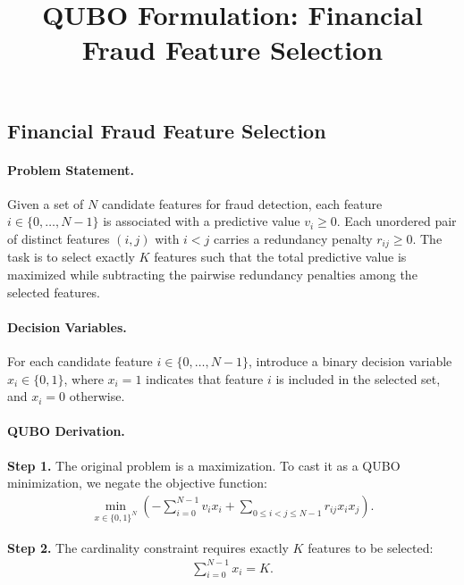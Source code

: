 \documentclass[12pt]{article}
\title{QUBO Formulation: Financial Fraud Feature Selection}
\date{}
\begin{document}
\maketitle

\subsection*{Financial Fraud Feature Selection}

\paragraph{Problem Statement.}
Given a set of $N$ candidate features for fraud detection, each feature $i \in \{0, \dots, N-1\}$ is associated with a predictive value $v_i \geq 0$. Each unordered pair of distinct features $(i,j)$ with $i < j$ carries a redundancy penalty $r_{ij} \geq 0$. The task is to select exactly $K$ features such that the total predictive value is maximized while subtracting the pairwise redundancy penalties among the selected features.

\paragraph{Decision Variables.}
For each candidate feature $i \in \{0, \dots, N-1\}$, introduce a binary decision variable $x_i \in \{0,1\}$, where $x_i = 1$ indicates that feature $i$ is included in the selected set, and $x_i = 0$ otherwise.

\paragraph{QUBO Derivation.}
\textbf{Step 1.} The original problem is a maximization. To cast it as a QUBO minimization, we negate the objective function:
\begin{align}
\min_{x \in \{0,1\}^N} \left( -\sum_{i=0}^{N-1} v_i x_i + \sum_{0 \leq i < j \leq N-1} r_{ij} x_i x_j \right).
\end{align}

\textbf{Step 2.} The cardinality constraint requires exactly $K$ features to be selected:
\begin{align}
\sum_{i=0}^{N-1} x_i = K.
\end{align}
\end{document}
